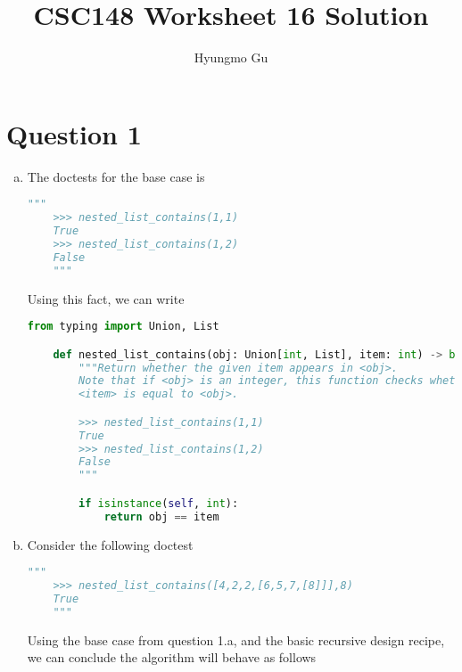 \documentclass[12pt]{article}
\begin{document}
\title{CSC148 Worksheet 16 Solution}
\author{Hyungmo Gu}
\maketitle

\section*{Question 1}
\begin{enumerate}[a.]
    \item

    The doctests for the base case is

    \begin{lstlisting}[language=python]
    """
    >>> nested_list_contains(1,1)
    True
    >>> nested_list_contains(1,2)
    False
    """
    \end{lstlisting}

    \bigskip

    Using this fact, we can write

    \begin{lstlisting}[language=python,caption={worksheet\_16\_q1a\_solution}]
    from typing import Union, List

    def nested_list_contains(obj: Union[int, List], item: int) -> bool:
        """Return whether the given item appears in <obj>.
        Note that if <obj> is an integer, this function checks whether
        <item> is equal to <obj>.

        >>> nested_list_contains(1,1)
        True
        >>> nested_list_contains(1,2)
        False
        """

        if isinstance(self, int):
            return obj == item
    \end{lstlisting}

    \item

    Consider the following doctest

    \begin{lstlisting}[language=python]
    """
    >>> nested_list_contains([4,2,2,[6,5,7,[8]]],8)
    True
    """
    \end{lstlisting}

    \bigskip


    Using the base case from question 1.a, and the basic recursive design recipe,
    we can conclude the algorithm will behave as follows

    \begin{mdframed}


\end{mdframed}
\end{enumerate}
\end{document}
